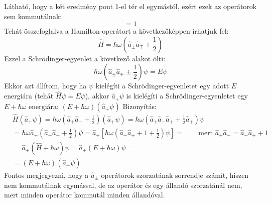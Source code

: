 \documentclass[../main.tex]{subfiles}
\begin{document}
Látható, hogy a két eredmény pont 1-el tér el egymástól, ezért ezek az operátorok sem kommutálnak:
\begin{equation}
    [\hat{a}_-, \hat{a}_+] = 1
\end{equation}
Tehát összefoglalva a Hamilton-operátort a következőképpen írhatjuk fel:
\begin{equation}
    \hat{H} = \hbar \omega \left( \hat{a}_\pm \hat{a}_\mp \pm \frac{1}{2} \right)
\end{equation}
Ezzel a Schrödinger-egyenlet a következő alakot ölti:
\begin{equation}
    \hbar \omega \left( \hat{a}_\pm \hat{a}_\mp \pm \frac{1}{2} \right) \psi = E \psi
\end{equation}
Ekkor azt állítom, hogy ha $\psi$ kielégíti a Schrödinger-egyenletet egy adott $E$ energiára (tehát $\hat{H} \psi = E \psi$), akkor
$\hat{a}_+\psi$ is kielégíti a Schrödinger-egyenletet egy $E + \hbar \omega$ energiára: $(E + \hbar \omega)(\hat{a}_+\psi)$
\newline
\newline
Bizonyítás:
\begin{equation}
    \begin{aligned}
    & \hat{H} (\hat{a}_+ \psi) = \hbar \omega \left( \hat{a}_+ \hat{a}_- + \frac{1}{2} \right) (\hat{a}_+ \psi) = \hbar \omega \left( \hat{a}_+ \hat{a}_- \hat{a}_+ + \frac{1}{2} \hat{a}_+  \right)\psi \\
    & = \hbar \omega \hat{a}_+ \left(\hat{a}_- \hat{a}_+ + \frac{1}{2}\right)\psi = \hat{a}_+ \left[\hbar \omega \left(\hat{a}_- \hat{a}_+ + 1 + \frac{1}{2}\right)\psi\right] = \quad \quad \text{mert } \hat{a}_+ \hat{a}_- = \hat{a}_- \hat{a}_+ + 1 \\
    & = \hat{a}_+ \left( \hat{H} + \hbar \omega \right) \psi = \hat{a}_+ (E + \hbar \omega) \psi = \\
    & = (E + \hbar \omega)(\hat{a}_+ \psi)
    \end{aligned}
\end{equation}
Fontos megjegyezni, hogy a $\hat{a}_\pm$ operátorok szorzatának sorrendje számít, hiszen nem kommutálnak egymással, de az operátor és egy állandó 
szorzatánál nem, mert minden operátor kommutál minden állandóval.
\end{document}
